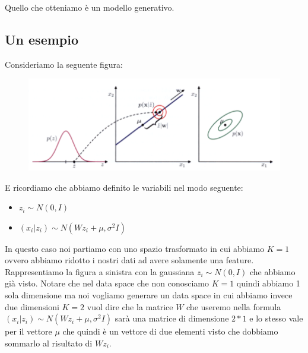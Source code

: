 \documentclass[14pt]{extreport}
\begin{document}
Quello che otteniamo è un modello generativo.

\subsection{Un esempio}

Consideriamo la seguente figura:


\begin{figure}[H] 
\centering
\includegraphics[width=0.7\linewidth]{483.jpeg}
\end{figure}

E ricordiamo che abbiamo definito le variabili nel modo seguente:

\begin{itemize}
\item $z_i \sim N(0, I)$
\item $(x_i | z_i) \sim N(Wz_i + \mu, \sigma^2I)$
\end{itemize}

In questo caso noi partiamo con uno spazio trasformato in cui abbiamo $K=1$ ovvero abbiamo ridotto i nostri dati ad avere solamente una feature.
Rappresentiamo la figura a sinistra con la gaussiana $z_i \sim N(0, I)$ che abbiamo già visto. 
Notare che nel data space che non conosciamo $K=1$ quindi abbiamo 1 sola dimensione ma noi vogliamo generare un data space in cui abbiamo invece 
due dimensioni $K=2$ vuol dire che la matrice $W$ che useremo nella formula
$(x_i | z_i) \sim N(Wz_i + \mu, \sigma^2I)$ sarà una matrice di dimensione $2*1$ e lo stesso vale per il vettore $\mu$ che quindi è un vettore di due elementi
visto che dobbiamo sommarlo al risultato di $Wz_i$.
\end{document}
